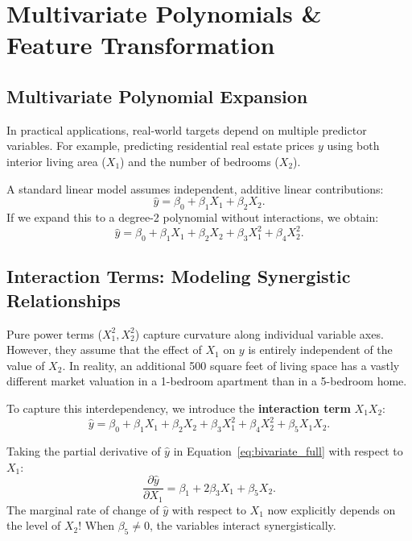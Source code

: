 \documentclass[11pt,a4paper]{article}
\numberwithin{equation}{section}
\begin{document}
\section{Multivariate Polynomials \& Feature Transformation}

\subsection{Multivariate Polynomial Expansion}
In practical applications, real-world targets depend on multiple predictor variables. For example, predicting residential real estate prices $y$ using both interior living area ($X_1$) and the number of bedrooms ($X_2$).

A standard linear model assumes independent, additive linear contributions:
\begin{equation}
  \hat{y} = \beta_0 + \beta_1 X_1 + \beta_2 X_2.
\end{equation}
If we expand this to a degree-2 polynomial without interactions, we obtain:
\begin{equation}
  \hat{y} = \beta_0 + \beta_1 X_1 + \beta_2 X_2 + \beta_3 X_1^2 + \beta_4 X_2^2.
\end{equation}

\subsection{Interaction Terms: Modeling Synergistic Relationships}
Pure power terms ($X_1^2, X_2^2$) capture curvature along individual variable axes. However, they assume that the effect of $X_1$ on $y$ is entirely independent of the value of $X_2$. In reality, an additional 500 square feet of living space has a vastly different market valuation in a 1-bedroom apartment than in a 5-bedroom home.

To capture this interdependency, we introduce the \textbf{interaction term} $X_1 X_2$:
\begin{equation}
  \boxed{\hat{y} = \beta_0 + \beta_1 X_1 + \beta_2 X_2 + \beta_3 X_1^2 + \beta_4 X_2^2 + \beta_5 X_1 X_2.}
  \label{eq:bivariate_full}
\end{equation}

\begin{intuition}[title=Interpreting Interaction Terms via Partial Derivatives]
Taking the partial derivative of $\hat{y}$ in Equation~\eqref{eq:bivariate_full} with respect to $X_1$:
\begin{equation}
  \frac{\partial \hat{y}}{\partial X_1} = \beta_1 + 2\beta_3 X_1 + \beta_5 X_2.
\end{equation}
The marginal rate of change of $\hat{y}$ with respect to $X_1$ now explicitly depends on the level of $X_2$! When $\beta_5 \neq 0$, the variables interact synergistically.
\end{intuition}
\end{document}
